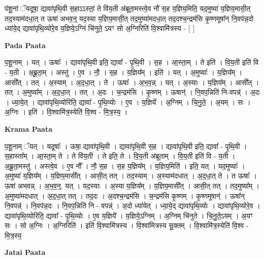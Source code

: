 \documentclass[17pt]{extarticle}
\begin{document}
प॑शू॒नां ॅयदूषा॒ द्यावा॑पृथि॒वी स॒हाऽऽस्तां॒ ते वि॑य॒ती अ॑ब्रूता॒मस्त्वे॒व नौ॑ स॒ह य॒ज्ञिय॒मिति॒ यद॒मुष्या॑ य॒ज्ञिय॒मासी॒त् तद॒स्याम॑दधा॒त् त ऊषा॑ अभव॒न्॒ यद॒स्या य॒ज्ञिय॒मासी॒त् तद॒मुष्या॑मदधा॒त् तद॒दश्च॒न्द्रम॑सि कृ॒ष्णमूषा᳚न् नि॒वप॑न्न॒दो ध्या॑ये॒द् द्यावा॑पृथि॒व्योरे॒व य॒ज्ञिये॒ऽग्निं चि॑नुते॒ ऽयꣳ सो अ॒ग्निरिति॑ वि॒श्वामि॑त्रस्य - [  ] \newline

\textbf{Pada Paata} \newline

प॒शू॒नाम् । यत् । ऊषाः᳚ । द्यावा॑पृथि॒वी इति॒ द्यावा᳚ - पृ॒थि॒वी । स॒ह । आ॒स्ता॒म् । ते इति॑ । वि॒य॒ती इति॑ वि - य॒ती । अ॒ब्रू॒ता॒म् । अस्तु॑ । ए॒व । नौ॒ । स॒ह । य॒ज्ञिय᳚म् । इति॑ । यत् । अ॒मुष्याः᳚ । य॒ज्ञिय᳚म् । आसी᳚त् । तत् । अ॒स्याम् । अ॒द॒धा॒त् । ते । ऊषाः᳚ । अ॒भ॒व॒न्न् । यत् । अ॒स्याः । य॒ज्ञिय᳚म् । आसी᳚त् । तत् । अ॒मुष्या᳚म् । अ॒द॒धा॒त् । तत् । अ॒दः । च॒न्द्रम॑सि । कृ॒ष्णम् । ऊषान्॑ । नि॒वप॒न्निति॑ नि-वपन्न्॑ । अ॒दः । ध्या॒ये॒त् । द्यावा॑पृथि॒व्योरिति॒ द्यावा᳚ - पृ॒थि॒व्योः । ए॒व । य॒ज्ञिये᳚ । अ॒ग्निम् । चि॒नु॒ते॒ । अ॒यम् । सः । अ॒ग्निः । इति॑ । वि॒श्वामि॑त्र॒स्येति॑ वि॒श्व - मि॒त्र॒स्य॒ ।  \newline


\textbf{Krama Paata} \newline

प॒शू॒नाम् ॅयत् । यदूषाः᳚ । ऊषा॒ द्यावा॑पृथि॒वी । द्यावा॑पृथि॒वी स॒ह । द्यावा॑पृथि॒वी इति॒ द्यावा᳚ - पृ॒थि॒वी । स॒हास्ता᳚म् । आ॒स्ता॒म् ते । ते वि॑य॒ती । ते इति॒ ते । वि॒य॒ती अ॑ब्रूताम् । वि॒य॒ती इति॑ वि - य॒ती । अ॒ब्रू॒ता॒मस्तु॑ । अस्त्वे॒व । ए॒व नौ᳚ । नौ॒ स॒ह । स॒ह य॒ज्ञिय᳚म् । य॒ज्ञिय॒मिति॑ । इति॒ यत् । यद॒मुष्याः᳚ । अ॒मुष्या॑ य॒ज्ञिय᳚म् । य॒ज्ञिय॒मासी᳚त् । आसी॒त् तत् । तद॒स्याम् । अ॒स्याम॑दधात् । अ॒द॒धा॒त् ते । त ऊषाः᳚ । ऊषा॑ अभवन्न् । अ॒भ॒व॒न्॒. यत् । यद॒स्याः । अ॒स्या य॒ज्ञिय᳚म् । य॒ज्ञिय॒मासी᳚त् । आसी॒त् तत् । तद॒मुष्या᳚म् । अ॒मुष्या॑मदधात् । अ॒द॒धा॒त् तत् । तद॒दः । अ॒दश्च॒न्द्रम॑सि । च॒न्द्रम॑सि कृ॒ष्णम् । कृ॒ष्णमूषान्॑ । ऊषा᳚न् नि॒वपन्न्॑ । नि॒वप॑न्न॒दः । नि॒वप॒न्निति॑ नि - वपन्न्॑ । अ॒दो ध्या॑येत् । ध्या॒ये॒द् द्यावा॑पृथि॒व्योः । द्यावा॑पृथि॒व्योरे॒व । द्यावा॑पृथि॒व्योरिति॒ द्यावा᳚ - पृ॒थि॒व्योः । ए॒व य॒ज्ञिये᳚ । य॒ज्ञिये॒ऽग्निम् । अ॒ग्निम् चि॑नुते । चि॒नु॒ते॒ऽयम् । अ॒यꣳ सः । सो अ॒ग्निः । अ॒ग्निरिति॑ । इति॑ वि॒श्वामि॑त्रस्य । वि॒श्वा॑मित्रस्य सू॒क्तम् । वि॒श्वामि॑त्र॒स्येति॑ वि॒श्व - मि॒त्र॒स्य॒ \newline

\textbf{Jatai Paata} \newline
\end{document}

